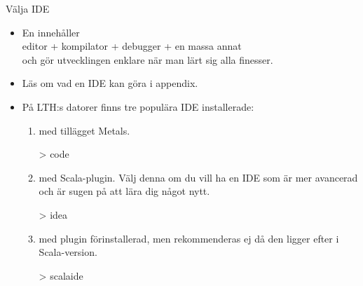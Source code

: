

\begin{Slide}{Välja IDE}\SlideFontSmall
\begin{itemize}
\item En   innehåller \\ editor + kompilator + debugger + en massa annat\\och gör utvecklingen enklare när man lärt sig alla finesser.

\item Läs om vad en IDE kan göra i appendix.

\pause

\item På LTH:s datorer finns tre populära IDE installerade:
\begin{enumerate}\SlideFontSmall

\item {} med tillägget Metals. 
\begin{REPL}[numbers=none]
> code
\end{REPL}


\item {} med Scala-plugin. Välj denna om du vill ha en IDE som är mer avancerad och är sugen på att lära dig något nytt.
\begin{REPL}[numbers=none]
> idea
\end{REPL}

\item {} med plugin  förinstallerad, men rekommenderas ej då den ligger efter i Scala-version.
\begin{REPL}[numbers=none]
> scalaide
\end{REPL}

\end{enumerate}
\end{itemize}
\end{Slide}

